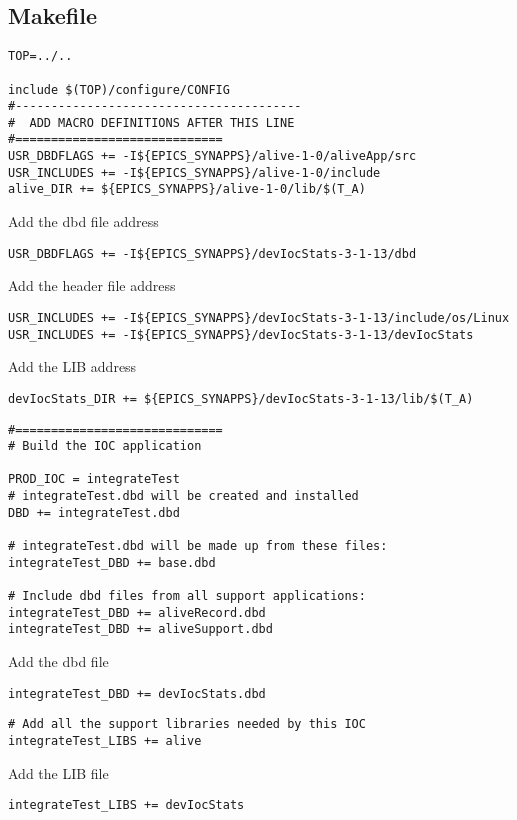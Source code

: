 \documentclass[11pt
  , a4paper
  , article
  , oneside
]{memoir}
\begin{document}
\subsection{Makefile}
\begin{lstlisting}[style=termstyle]
TOP=../..

include $(TOP)/configure/CONFIG
#----------------------------------------
#  ADD MACRO DEFINITIONS AFTER THIS LINE
#=============================
USR_DBDFLAGS += -I${EPICS_SYNAPPS}/alive-1-0/aliveApp/src
USR_INCLUDES += -I${EPICS_SYNAPPS}/alive-1-0/include
alive_DIR += ${EPICS_SYNAPPS}/alive-1-0/lib/$(T_A)
\end{lstlisting}
Add the dbd file address
\begin{lstlisting}[style=termstyle]
USR_DBDFLAGS += -I${EPICS_SYNAPPS}/devIocStats-3-1-13/dbd
\end{lstlisting}
Add the header file address
\begin{lstlisting}[style=termstyle]
USR_INCLUDES += -I${EPICS_SYNAPPS}/devIocStats-3-1-13/include/os/Linux
USR_INCLUDES += -I${EPICS_SYNAPPS}/devIocStats-3-1-13/devIocStats
\end{lstlisting}
Add the LIB address
\begin{lstlisting}[style=termstyle]
devIocStats_DIR += ${EPICS_SYNAPPS}/devIocStats-3-1-13/lib/$(T_A)
\end{lstlisting}
\begin{lstlisting}[style=termstyle]
#=============================
# Build the IOC application

PROD_IOC = integrateTest
# integrateTest.dbd will be created and installed
DBD += integrateTest.dbd

# integrateTest.dbd will be made up from these files:
integrateTest_DBD += base.dbd

# Include dbd files from all support applications:
integrateTest_DBD += aliveRecord.dbd
integrateTest_DBD += aliveSupport.dbd
\end{lstlisting}
Add the dbd file
\begin{lstlisting}[style=termstyle]
integrateTest_DBD += devIocStats.dbd
\end{lstlisting}
\begin{lstlisting}[style=termstyle]
# Add all the support libraries needed by this IOC
integrateTest_LIBS += alive
\end{lstlisting}
Add the LIB file
\begin{lstlisting}[style=termstyle]
integrateTest_LIBS += devIocStats
\end{lstlisting}
\end{document}
